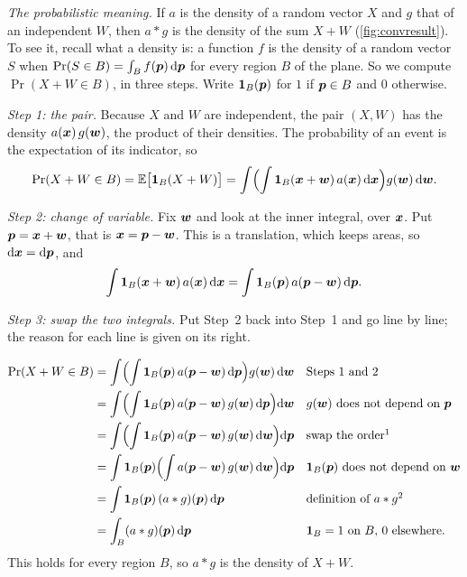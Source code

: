 \emph{The probabilistic meaning.} If $a$ is the density of a random
vector $X$ and $g$ that of an independent $W$, then $a\ast g$ is the
density of the sum $X+W$ (\cref{fig:convresult}). To see it, recall what
a density is: a function $f$ is the density of a random vector $S$ when
$\Pr(S\in B)=\int_Bf(\bm{p})\,\mathrm d\bm{p}$ for every region $B$ of the plane.
So we compute $\Pr(X+W\in B)$, in three steps. Write $\mathbf 1_B(\bm{p})$
for $1$ if $\bm{p}\in B$ and $0$ otherwise.

\emph{Step 1: the pair.} Because $X$ and $W$ are independent, the pair
$(X,W)$ has the density $a(\bm{x})\,g(\bm{w})$, the product of their
densities. The probability of an event is the expectation of its
indicator, so
\[
  \Pr(X+W\in B)=\mathbb{E}\bigl[\mathbf 1_B(X+W)\bigr]
  =\int\Bigl(\int\mathbf 1_B(\bm{x}+\bm{w})\,a(\bm{x})\,
   \mathrm d\bm{x}\Bigr)g(\bm{w})\,\mathrm d\bm{w} .
\]

\emph{Step 2: change of variable.} Fix $\bm{w}$ and look at the inner
integral, over $\bm{x}$. Put $\bm{p}=\bm{x}+\bm{w}$, that is
$\bm{x}=\bm{p}-\bm{w}$. This is a translation, which keeps areas, so
$\mathrm d\bm{x}=\mathrm d\bm{p}$, and
\[
  \int\mathbf 1_B(\bm{x}+\bm{w})\,a(\bm{x})\,\mathrm d\bm{x}
  =\int\mathbf 1_B(\bm{p})\,a(\bm{p}-\bm{w})\,\mathrm d\bm{p} .
\]

\emph{Step 3: swap the two integrals.} Put Step~2 back into Step~1 and
go line by line; the reason for each line is given on its right.%
\addtocounter{footnote}{1}%
%
\addtocounter{footnote}{1}%
%
\addtocounter{footnote}{-2}%
\begin{align*}
  \Pr(X+W\in B)
  &=\int\Bigl(\int\mathbf 1_B(\p)\,a(\p-\vect w)\,\mathrm d\p\Bigr)
    g(\vect w)\,\mathrm d\vect w
  &&\text{Steps 1 and 2}\\
  &=\int\Bigl(\int\mathbf 1_B(\p)\,a(\p-\vect w)\,g(\vect w)\,
    \mathrm d\p\Bigr)\mathrm d\vect w
  &&\text{$g(\vect w)$ does not depend on $\p$}\\
  &=\int\Bigl(\int\mathbf 1_B(\p)\,a(\p-\vect w)\,g(\vect w)\,
    \mathrm d\vect w\Bigr)\mathrm d\p
  &&\text{swap the order}\footnotemark\\
  &=\int\mathbf 1_B(\p)\Bigl(\int a(\p-\vect w)\,g(\vect w)\,
    \mathrm d\vect w\Bigr)\mathrm d\p
  &&\text{$\mathbf 1_B(\p)$ does not depend on $\vect w$}\\
  &=\int\mathbf 1_B(\p)\,(a\ast g)(\p)\,\mathrm d\p
  &&\text{definition of $a\ast g$}\footnotemark\\
  &=\int_B(a\ast g)(\p)\,\mathrm d\p
  &&\text{$\mathbf 1_B=1$ on $B$, $0$ elsewhere.}
\end{align*}
This holds for every
region $B$, so $a\ast g$ is the density of $X+W$.

